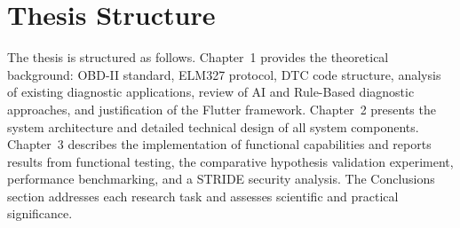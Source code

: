 \section*{Thesis Structure}

The thesis is structured as follows.
Chapter~1 provides the theoretical background: OBD-II standard, ELM327 protocol, DTC code structure, analysis of existing diagnostic applications, review of AI and Rule-Based diagnostic approaches, and justification of the Flutter framework.
Chapter~2 presents the system architecture and detailed technical design of all system components.
Chapter~3 describes the implementation of functional capabilities and reports results from functional testing, the comparative hypothesis validation experiment, performance benchmarking, and a STRIDE security analysis.
The Conclusions section addresses each research task and assesses scientific and practical significance.

\clearpage
